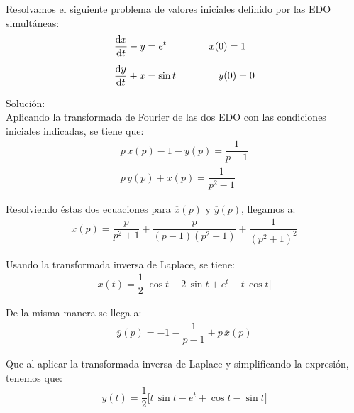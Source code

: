 \begin{ejemplo}
Resolvamos el siguiente problema de valores iniciales definido por las EDO simultáneas:
\begin{align*}
\dv{x}{t} - y &= e^{t} \hspace{1.5cm} x(0) =  1 \\[0.5em]
\dv{y}{t} + x &= \sin t \hspace{1.5cm} y(0) =  0
\end{align*}

Solución:
\\[0.5em]
Aplicando la transformada de Fourier de las dos EDO con las condiciones iniciales indicadas, se tiene que:
\begin{align*}
p \, \overline{x} (p) - 1 - \overline{y} (p) = \dfrac{1}{p -1} \\[0.5em]
p \, \overline{y} (p) + \overline{x} (p) = \dfrac{1}{p^{2} -1}
\end{align*}

Resolviendo éstas dos ecuaciones para $\overline{x}(p)$ y $\overline{y}(p)$, llegamos a:
\begin{align*}
\overline{x}(p) = \dfrac{p}{p^{2} + 1} + \dfrac{p}{(p - 1)(p^{2} + 1)} + \dfrac{1}{(p^{2} + 1)^{2}}
\end{align*}

Usando la transformada inversa de Laplace, se tiene:
\begin{align*}
x(t) = \dfrac{1}{2} \big[ \cos t + 2 \, \sin t +  e^{t} - t \, \cos t \big]
\end{align*}

De la misma manera se llega a:
\begin{align*}
\overline{y} (p) = - 1 - \dfrac{1}{p - 1} + p \, \overline{x} (p)
\end{align*}

Que al aplicar la transformada inversa de Laplace y simplificando la expresión, tenemos que:
\begin{align*}
y(t)= \dfrac{1}{2} \big[ t \, \sin t - e^{t} + \cos t - \sin t \big]
\end{align*}
\end{ejemplo}

